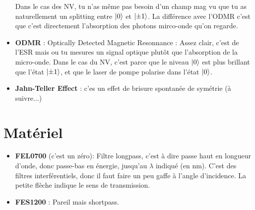\documentclass[a4paper]{report}
\begin{document}
\begin{itemize}
Dans le cas des NV, tu n'as même pas besoin d'un champ mag vu que tu as naturellement un splitting entre $\ket{0}$ et $\ket{\pm 1}$. La différence avec l'ODMR c'est que c'est directement l'absorption des photons mirco-onde qu'on regarde. 

\item \textbf{ODMR} : Optically Detected Magnetic Resonnance : Assez clair, c'est de l'ESR mais ou tu mesures un signal optique plutôt que l'absorption de la micro-onde. Dans le cas du NV, c'est parce que le niveau $\ket{0}$ est plus brillant que l'état $\ket{\pm 1}$, et que le laser de pompe polarise dans l'état $\ket{0}$.

\item \textbf{Jahn-Teller Effect} : c'es un effet de brisure spontanée de symétrie (à suivre...)
\end{itemize}
  \section{Matériel}
  \begin{itemize}
  \item \textbf{FEL0700} (c'est un zéro): Filtre longpass, c'est à dire passe haut en longueur d'onde, donc passe-bas en énergie, jusqu'au $\lambda$ indiqué (en nm). C'est des filtres interférentiels, donc il faut faire un peu gaffe à l'angle d'incidence. La petite flèche indique le sens de transmission.
  \item \textbf{FES1200} : Pareil mais shortpass.
  \end{itemize}
  
 
  
\end{document}
